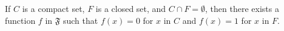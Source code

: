If $C$ is a compact set, $F$ is a closed set, and $C \cap F = \emptyset$, then there exists a function $f$ in $\mathfrak{F}$ such that $f(x) = 0$ for $x$ in $C$ and $f(x) = 1$ for $x$ in $F$.
